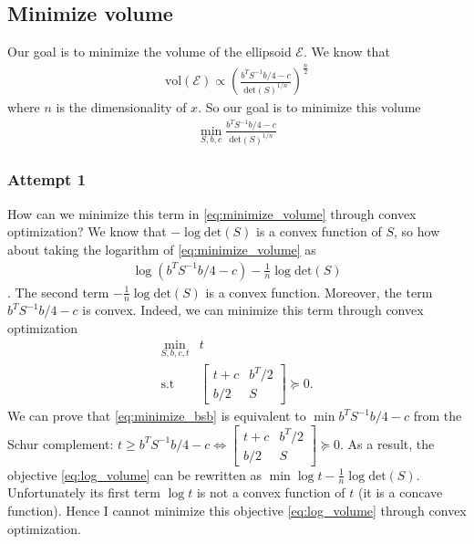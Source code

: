 \documentclass{article}
\begin{document}
\subsection{Minimize volume}
Our goal is to minimize the volume of the ellipsoid $\mathcal{E}$. We know that
\begin{align}
	\text{vol}(\mathcal{E})\propto\left(\frac{b^TS^{-1}b/4-c}{\text{det}(S)^{1/n}}\right)^{\frac{n}{2}} \label{eq:ellipsoid_volume}
\end{align}
where $n$ is the dimensionality of $x$. So our goal is to minimize this volume
\begin{align}
	\min_{S, b, c} \frac{b^TS^{-1}b/4-c}{\text{det}(S)^{1/n}} \label{eq:minimize_volume}
\end{align}

\subsubsection{Attempt 1}
How can we minimize this term in \eqref{eq:minimize_volume} through convex optimization? We know that $-\log\text{det}(S)$ is a convex function of $S$, so how about taking the logarithm of \eqref{eq:minimize_volume} as
\begin{align}
	\log(b^TS^{-1}b/4-c) - \frac{1}{n}\log\text{det}(S) \label{eq:log_volume}
\end{align}
. The second term $-\frac{1}{n}\log\text{det}(S)$ is a convex function. Moreover, the term $b^TS^{-1}b/4-c$ is convex. Indeed, we can minimize this term through convex optimization
\begin{subequations}
\begin{align}
	\min_{S, b, c, t}& t\\
	\text{s.t }& \begin{bmatrix} t + c & b^T/2\\ b/2 & S \end{bmatrix} \succeq 0.
\end{align}
\label{eq:minimize_bsb}
\end{subequations}
We can prove that \eqref{eq:minimize_bsb} is equivalent to $\min b^TS^{-1}b/4-c$ from the Schur complement: $t \ge b^TS^{-1}b/4-c \Leftrightarrow \begin{bmatrix} t+c & b^T/2 \\b/2 & S \end{bmatrix} \succeq 0$. As a result, the objective \eqref{eq:log_volume} can be rewritten as $\min \log t - \frac{1}{n}\log\text{det}(S)$. Unfortunately its first term $\log t$ is not a convex function of $t$ (it is a concave function). Hence I cannot minimize this objective \eqref{eq:log_volume} through convex optimization.
\end{document}
